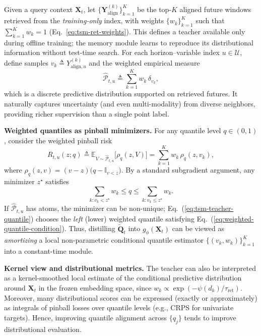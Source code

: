 Given a query context $\mathbf{X}_t$, let $\{\mathbf{Y}^{(k)}_{\text{align}}\}_{k=1}^{K}$ be the top-$K$
aligned future windows retrieved from the \emph{training-only} index, with weights
$\{w_k\}_{k=1}^{K}$ such that $\sum_{k=1}^{K} w_k = 1$ (Eq.~\ref{eq:tsm-ret-weights}).
This defines a teacher available only during offline training; the memory module learns to reproduce its
distributional information without test-time search.
For each horizon--variable index $u\in\mathcal{U}$, define samples
$v_k \triangleq Y^{(k)}_{\text{align},u}$ and the weighted empirical measure
\begin{equation}
\widehat{\mathcal{P}}_{t,u}
\triangleq
\sum_{k=1}^{K} w_k \,\delta_{v_k},
\end{equation}
which is a discrete predictive distribution supported on retrieved futures. It naturally captures uncertainty
(and even multi-modality) from diverse neighbors, providing richer supervision than a single point label.

\noindent\textbf{Weighted quantiles as pinball minimizers.}
For any quantile level $q\in(0,1)$, consider the weighted pinball risk
\begin{equation}
R_{t,u}(z;q)
\triangleq
\mathbb{E}_{V\sim \widehat{\mathcal{P}}_{t,u}}
\big[\rho_{q}(z,V)\big]
=
\sum_{k=1}^{K} w_k \,\rho_{q}(z,v_k),
\end{equation}
where $\rho_q(z,v)=(v-z)\big(q-\mathbb{I}_{v<z}\big)$.
By a standard subgradient argument, any minimizer $z^\star$ satisfies
\begin{equation}
\sum_{k: v_k < z^\star} w_k \le q \le \sum_{k: v_k \le z^\star} w_k.
\label{eq:weighted-quantile-condition}
\end{equation}
If $\widehat{\mathcal{P}}_{t,u}$ has atoms, the minimizer can be non-unique; Eq.~(\ref{eq:tsm-teacher-quantile})
chooses the \emph{left} (lower) weighted quantile satisfying Eq.~(\ref{eq:weighted-quantile-condition}).
Thus, distilling $\widetilde{\mathbf{Q}}_t$ into $g_{\phi}(\mathbf{X}_t)$ can be viewed as \emph{amortizing} a
local non-parametric conditional quantile estimator $\{(v_k,w_k)\}_{k=1}^{K}$ into a constant-time module.

\noindent\textbf{Kernel view and distributional metrics.}
The teacher can also be interpreted as a kernel-smoothed local estimate of the conditional predictive
distribution around $\mathbf{X}_t$ in the frozen embedding space, since
$w_k \propto \exp(-\psi(d_k)/\tau_{\text{ret}})$.
Moreover, many distributional scores can be expressed (exactly or approximately) as integrals of pinball
losses over quantile levels (e.g., CRPS for univariate targets). Hence, improving quantile alignment across
$\{q_j\}$ tends to improve distributional evaluation.


